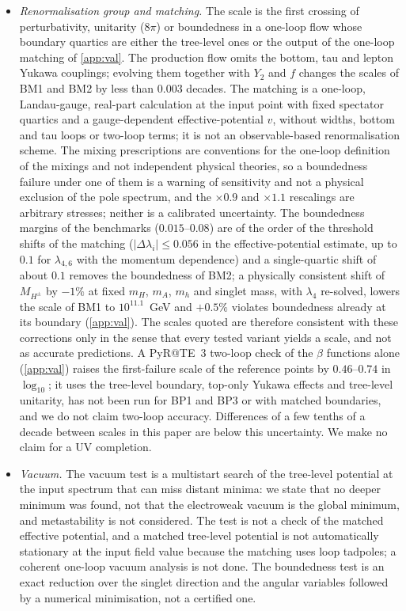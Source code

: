\documentclass[twocolumn,epjc3]{svjour3}
\begin{document}
\begin{itemize}
\item \emph{Renormalisation group and matching.} The scale is the first crossing of perturbativity, unitarity ($8\pi$) or boundedness in a one-loop flow whose boundary quartics are either the tree-level ones or the output of the one-loop matching of \ref{app:val}. The production flow omits the bottom, tau and lepton Yukawa couplings; evolving them together with $Y_2$ and $f$ changes the scales of BM1 and BM2 by less than $0.003$ decades. The matching is a one-loop, Landau-gauge, real-part calculation at the input point with fixed spectator quartics and a gauge-dependent effective-potential $v$, without widths, bottom and tau loops or two-loop terms; it is not an observable-based renormalisation scheme. The mixing prescriptions are conventions for the one-loop definition of the mixings and not independent physical theories, so a boundedness failure under one of them is a warning of sensitivity and not a physical exclusion of the pole spectrum, and the $\times0.9$ and $\times1.1$ rescalings are arbitrary stresses; neither is a calibrated uncertainty. The boundedness margins of the benchmarks ($0.015$--$0.08$) are of the order of the threshold shifts of the matching ($|\Delta\lambda_i|\le0.056$ in the effective-potential estimate, up to $0.1$ for $\lambda_{4,6}$ with the momentum dependence) and a single-quartic shift of about $0.1$ removes the boundedness of BM2; a physically consistent shift of $M_{H^\pm}$ by $-1\%$ at fixed $m_H$, $m_A$, $m_h$ and singlet mass, with $\lambda_4$ re-solved, lowers the scale of BM1 to $10^{11.1}$~GeV and $+0.5\%$ violates boundedness already at its boundary (\ref{app:val}). The scales quoted are therefore consistent with these corrections only in the sense that every tested variant yields a scale, and not as accurate predictions. A PyR@TE~3 two-loop check of the $\beta$ functions alone (\ref{app:val}) raises the first-failure scale of the reference points by $0.46$--$0.74$ in $\log_{10}$; it uses the tree-level boundary, top-only Yukawa effects and tree-level unitarity, has not been run for BP1 and BP3 or with matched boundaries, and we do not claim two-loop accuracy. Differences of a few tenths of a decade between scales in this paper are below this uncertainty. We make no claim for a UV completion.
\item \emph{Vacuum.} The vacuum test is a multistart search of the tree-level potential at the input spectrum that can miss distant minima: we state that no deeper minimum was found, not that the electroweak vacuum is the global minimum, and metastability is not considered. The test is not a check of the matched effective potential, and a matched tree-level potential is not automatically stationary at the input field value because the matching uses loop tadpoles; a coherent one-loop vacuum analysis is not done. The boundedness test is an exact reduction over the singlet direction and the angular variables followed by a numerical minimisation, not a certified one.

\end{itemize}
\end{document}

